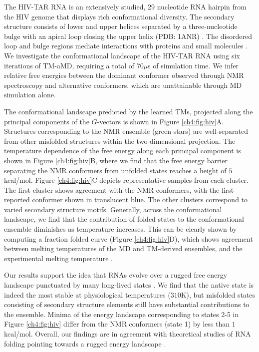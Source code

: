 The HIV-TAR RNA is an extensively studied, 29 nucleotide RNA hairpin from the HIV genome that displays rich conformational diversity. The secondary structure consists of lower and upper helices separated by a three-nucleotide bulge with an apical loop closing the upper helix (PDB: 1ANR) \cite{hiv-nmr}. The disordered loop and bulge regions mediate interactions with proteins and small molecules \cite{hiv-tar-binding}. We investigate the conformational landscape of the HIV-TAR RNA using six iterations of TM-aMD, requiring a total of 70$\mu$s of simulation time. We infer relative free energies between the dominant conformer observed through NMR spectroscopy and alternative conformers, which are unattainable through MD simulation alone.

The conformational landscape predicted by the learned TMs, projected along the principal components of the $G$-vectors is shown in Figure \ref{ch4:fig:hiv}A. Structures corresponding to the NMR ensemble (green stars) are well-separated from other misfolded structures within the two-dimensional projection. The temperature dependence of the free energy along each principal component is shown in Figure \ref{ch4:fig:hiv}B, where we find that the free energy barrier separating the NMR conformers from unfolded states reaches a height of $5$kcal/mol. Figure \ref{ch4:fig:hiv}C depicts representative samples from each cluster.  The first cluster shows agreement with the NMR conformers, with the first reported conformer shown in translucent blue. The other clusters correspond to varied secondary structure motifs. Generally, across the conformational landscape, we find that the contribution of folded states to the conformational ensemble diminishes as temperature increases. This can be clearly shown by computing a fraction folded curve (Figure \ref{ch4:fig:hiv}D), which shows agreement between melting temperatures of the MD and TM-derived ensembles, and the experimental melting temperature \cite{hiv-experiment}.

Our results support the idea that RNAs evolve over a rugged free energy landscape punctuated by many long-lived states \cite{dill-chen}. We find that the native state is indeed the most stable at physiological temperatures ($310$K), but misfolded states consisting of secondary structure elements still have substantial contributions to the ensemble. Minima of the energy landscape corresponding to states 2-5 in Figure \ref{ch4:fig:hiv} differ from the NMR conformers (state 1) by less than $1$kcal/mol. Overall, our findings are in agreement with theoretical studies of RNA folding pointing towards a rugged energy landscape \cite{dill-chen,wales-RNA}.

